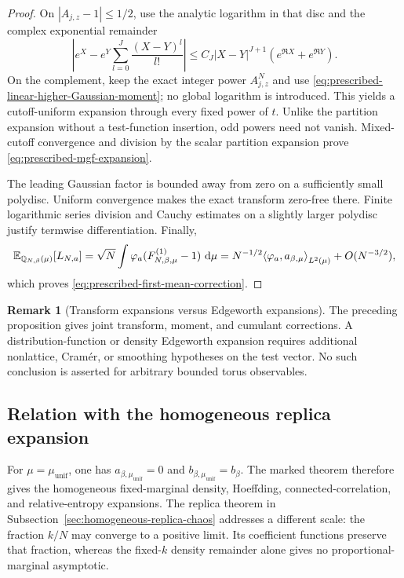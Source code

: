 \documentclass[11pt,reqno]{amsart}
\numberwithin{equation}{section}
\theoremstyle{plain}
\theoremstyle{definition}
\newtheorem{remark}[remark]{Remark}
\DeclarePairedDelimiter{\ip}{\langle}{\rangle}
\newcommand{\dd}{\mathop{}\!\mathrm d}
\newcommand{\E}{\mathbb E}
\newcommand{\Q}{\mathbb Q}
\newcommand{\be}{\beta}
\newcommand{\muunif}{\mu_{\mathrm{unif}}}
\begin{document}
\begin{proof}
On $|A_{j,z}-1|\leq1/2$, use the analytic logarithm in that disc and the complex exponential remainder
\begin{equation}
 \left|e^X-e^Y\sum_{l=0}^{J}\frac{(X-Y)^l}{l!}\right|
 \leq C_J|X-Y|^{J+1}(e^{\Re X}+e^{\Re Y}).
 \label{eq:prescribed-complex-exp-remainder}
\end{equation}
On the complement, keep the exact integer power $A_{j,z}^N$ and use \eqref{eq:prescribed-linear-higher-Gaussian-moment}; no global logarithm is introduced.  This yields a cutoff-uniform expansion through every fixed power of $t$.  Unlike the partition expansion without a test-function insertion, odd powers need not vanish.  Mixed-cutoff convergence and division by the scalar partition expansion prove \eqref{eq:prescribed-mgf-expansion}.

The leading Gaussian factor is bounded away from zero on a sufficiently small polydisc.  Uniform convergence makes the exact transform zero-free there.  Finite logarithmic series division and Cauchy estimates on a slightly larger polydisc justify termwise differentiation.  Finally,
\begin{equation}
 \E_{\Q_{N,\be}(\mu)}[L_{N,a}]
 =\sqrt N\int\varphi_a(F_{N,\be,\mu}^{(1)}-1)\,\dd\mu
 =N^{-1/2}\ip*{\varphi_a,a_{\be,\mu}}_{L^2(\mu)}+O(N^{-3/2}),
 \label{eq:prescribed-mean-from-onepoint}
\end{equation}
which proves \eqref{eq:prescribed-first-mean-correction}.
\end{proof}

\begin{remark}[Transform expansions versus Edgeworth expansions]
\label{rem:prescribed-no-Edgeworth}
The preceding proposition gives joint transform, moment, and cumulant corrections.  A distribution-function or density Edgeworth expansion requires additional nonlattice, Cram\'er, or smoothing hypotheses on the test vector.  No such conclusion is asserted for arbitrary bounded torus observables.
\end{remark}

\subsection{Relation with the homogeneous replica expansion}
\label{subsec:prescribed-versus-homogeneous}

For $\mu=\muunif$, one has $a_{\be,\muunif}=0$ and $b_{\be,\muunif}=b_\be$. The marked theorem therefore gives the homogeneous fixed-marginal density, Hoeffding, connected-correlation, and relative-entropy expansions. The replica theorem in Subsection~\ref{sec:homogeneous-replica-chaos} addresses a different scale: the fraction $k/N$ may converge to a positive limit. Its coefficient functions preserve that fraction, whereas the fixed-$k$ density remainder alone gives no proportional-marginal asymptotic.
\end{document}
